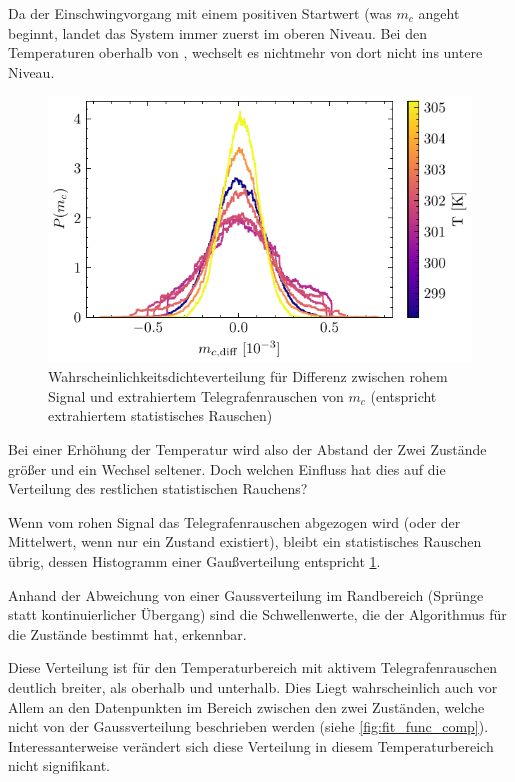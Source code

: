 \documentclass[main.tex]{subfiles}
\begin{document}
Da der Einschwingvorgang mit einem positiven Startwert (was \(m_c\) angeht beginnt, landet das System immer zuerst im oberen Niveau. Bei den Temperaturen oberhalb von , wechselt es nichtmehr von dort nicht ins untere Niveau. 

\begin{figure}[H]
    \centering
    \includegraphics{bilder/plots/temp_comparison_long/mc_diff_hist.pdf}
    \caption{Wahrscheinlichkeitsdichteverteilung für Differenz zwischen rohem Signal und extrahiertem Telegrafenrauschen von \(m_c\) (entspricht extrahiertem statistisches Rauschen)}\label{fig:temp-diff-hist}    
\end{figure}

Bei einer Erhöhung der Temperatur wird also der Abstand der Zwei Zustände größer und ein Wechsel seltener. Doch welchen Einfluss hat dies auf die Verteilung des restlichen statistischen Rauchens?

Wenn vom rohen Signal das Telegrafenrauschen abgezogen wird (oder der Mittelwert, wenn nur ein Zustand existiert), bleibt ein statistisches Rauschen übrig, dessen Histogramm einer Gaußverteilung entspricht \cref{fig:temp-diff-hist}. 

Anhand der Abweichung von einer Gaussverteilung im Randbereich (Sprünge statt kontinuierlicher Übergang) sind die Schwellenwerte, die der Algorithmus für die Zustände bestimmt hat, erkennbar.

Diese Verteilung ist für den Temperaturbereich mit aktivem Telegrafenrauschen deutlich breiter, als oberhalb und unterhalb. Dies Liegt wahrscheinlich auch vor Allem an den Datenpunkten im Bereich zwischen den zwei Zuständen, welche nicht von der Gaussverteilung beschrieben werden (siehe \cref{fig:fit_func_comp}).
Interessanterweise verändert sich diese Verteilung in diesem Temperaturbereich nicht signifikant.
\end{document}
